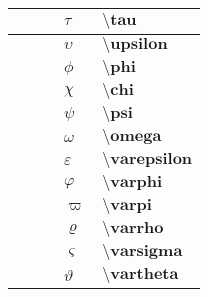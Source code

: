 \documentclass[10pt]{article}
\begin{document}
\begin{tabular}{|l|l|l|l|l|}
$\textbf{}$   & $\textbf{}$   &    & $\tau$   & $\textbf{\textbackslash tau}$   \\ \hline
$\textbf{}$   & $\textbf{}$   &    & $\upsilon$   & $\textbf{\textbackslash upsilon}$   \\ \hline
$\textbf{}$   & $\textbf{}$   &    & $\phi$   & $\textbf{\textbackslash phi}$   \\ \hline
$\textbf{}$   & $\textbf{}$   &    & $\chi$   & $\textbf{\textbackslash chi}$   \\ \hline
$\textbf{}$   & $\textbf{}$   &    & $\psi$   & $\textbf{\textbackslash psi}$   \\ \hline
$\textbf{}$   & $\textbf{}$   &    & $\omega$   & $\textbf{\textbackslash omega}$   \\ \hline


$\textbf{}$   & $\textbf{}$   &    & $\varepsilon$   & $\textbf{\textbackslash varepsilon}$   \\ \hline
$\textbf{}$   & $\textbf{}$   &    & $\varphi$   & $\textbf{\textbackslash varphi}$   \\ \hline
$\textbf{}$   & $\textbf{}$   &    & $\varpi$   & $\textbf{\textbackslash varpi}$   \\ \hline
$\textbf{}$   & $\textbf{}$   &    & $\varrho$   & $\textbf{\textbackslash varrho}$   \\ \hline
$\textbf{}$   & $\textbf{}$   &    & $\varsigma$   & $\textbf{\textbackslash varsigma}$   \\ \hline
$\textbf{}$   & $\textbf{}$   &    & $\vartheta$   & $\textbf{\textbackslash vartheta}$   \\ \hline
\end{tabular}
\end{document}
